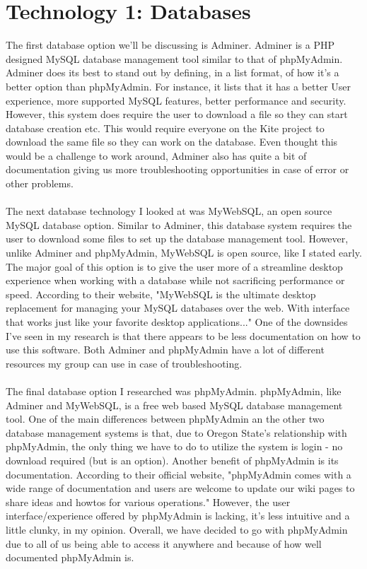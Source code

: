 \documentclass[letterpaper, 10, draftclsnofoot, onecolumn]{IEEEtran}
\begin{document}
\section*{\textbf{Technology 1: Databases}}
The first database option we'll be discussing is Adminer. Adminer is a PHP designed MySQL database management tool similar to that of phpMyAdmin. Adminer does its best to stand out by defining, in a list format, of how it's a better option than phpMyAdmin. For instance, it lists that it has a better User experience, more supported MySQL features, better performance and security\cite{r1}. However, this system does require the user to download a file so they can start database creation etc. This would require everyone on the Kite project to download the same file so they can work on the database. Even thought this would be a challenge to work around, Adminer also has quite a bit of documentation giving us more troubleshooting opportunities in case of error or other problems.   
\\ \\
\indent The next database technology I looked at was MyWebSQL, an open source MySQL database option. Similar to Adminer, this database system requires the user to download some files to set up the database management tool. However, unlike Adminer and phpMyAdmin, MyWebSQL is open source, like I stated early. The major goal of this option is to give the user more of a streamline desktop experience when working with a database while not sacrificing performance or speed. According to their website, "MyWebSQL is the ultimate desktop replacement for managing your MySQL databases over the web. With interface that works just like your favorite desktop applications...\cite{r2}" One of the downsides I've seen in my research is that there appears to be less documentation on how to use this software. Both Adminer and phpMyAdmin have a lot of different resources my group can use in case of troubleshooting.   
\\ \\
\indent The final database option I researched was phpMyAdmin. phpMyAdmin, like Adminer and MyWebSQL, is a free web based MySQL database management tool. One of the main differences between phpMyAdmin an the other two database management systems is that, due to Oregon State's relationship with phpMyAdmin, the only thing we have to do to utilize the system is login - no download required (but is an option). Another benefit of phpMyAdmin is its documentation. According to their official website, "phpMyAdmin comes with a wide range of documentation and users are welcome to update our wiki pages to share ideas and howtos for various operations\cite{r3}." However, the user interface/experience offered by phpMyAdmin is lacking, it's less intuitive and a little clunky, in my opinion. Overall, we have decided to go with phpMyAdmin due to all of us being able to access it anywhere and because of how well documented phpMyAdmin is.  
\end{document}
